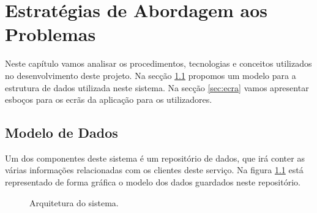 \chapter{Estratégias de Abordagem aos Problemas} \label{cap:abordagem}
Neste capítulo vamos analisar os procedimentos, tecnologias e conceitos utilizados no desenvolvimento deste projeto. Na secção \ref{sec:dados} propomos um modelo para a estrutura de dados utilizada neste sistema. Na secção \ref{sec:ecra} vamos apresentar esboços para os ecrãs da aplicação para os utilizadores.

\section{Modelo de Dados} \label{sec:dados}
Um dos componentes deste sistema é um repositório de dados, que irá conter as várias informações relacionadas com os clientes deste serviço. Na figura \ref{fig:relacoes} está representado de forma gráfica o modelo dos dados guardados neste repositório. \\

\begin{figure}[ht!]
\centering
{}
\caption{Arquitetura do sistema.}
\label{fig:relacoes}
\end{figure}

